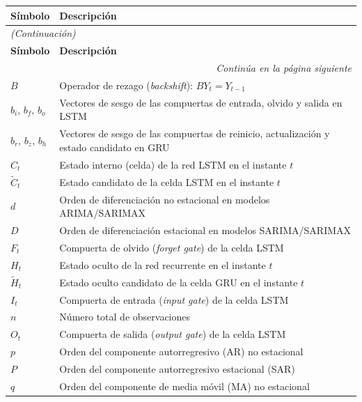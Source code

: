 \noindent
\begin{longtable}{p{3.5cm} p{10.5cm}}
\toprule
\textbf{Símbolo} & \textbf{Descripción} \\
\midrule
\endfirsthead
\multicolumn{2}{l}{\small\textit{(Continuación)}} \\[2pt]
\toprule
\textbf{Símbolo} & \textbf{Descripción} \\
\midrule
\endhead
\midrule
\multicolumn{2}{r}{\small\textit{Continúa en la página siguiente}} \\
\endfoot
\bottomrule
\endlastfoot
$B$                      & Operador de rezago (\textit{backshift}): $BY_t = Y_{t-1}$ \\[3pt]
$b_i,\,b_f,\,b_o$        & Vectores de sesgo de las compuertas de entrada, olvido y salida en LSTM \\[3pt]
$b_r,\,b_z,\,b_h$        & Vectores de sesgo de las compuertas de reinicio, actualización y estado candidato en GRU \\[3pt]
$C_t$                    & Estado interno (celda) de la red LSTM en el instante $t$ \\[3pt]
$\tilde{C}_t$            & Estado candidato de la celda LSTM en el instante $t$ \\[3pt]
$d$                      & Orden de diferenciación no estacional en modelos ARIMA/SARIMAX \\[3pt]
$D$                      & Orden de diferenciación estacional en modelos SARIMA/SARIMAX \\[3pt]
$F_t$                    & Compuerta de olvido (\textit{forget gate}) de la celda LSTM \\[3pt]
$H_t$                    & Estado oculto de la red recurrente en el instante $t$ \\[3pt]
$\tilde{H}_t$            & Estado oculto candidato de la celda GRU en el instante $t$ \\[3pt]
$I_t$                    & Compuerta de entrada (\textit{input gate}) de la celda LSTM \\[3pt]
$n$                      & Número total de observaciones \\[3pt]
$O_t$                    & Compuerta de salida (\textit{output gate}) de la celda LSTM \\[3pt]
$p$                      & Orden del componente autorregresivo (AR) no estacional \\[3pt]
$P$                      & Orden del componente autorregresivo estacional (SAR) \\[3pt]
$q$                      & Orden del componente de media móvil (MA) no estacional \\[3pt]

\end{longtable}

